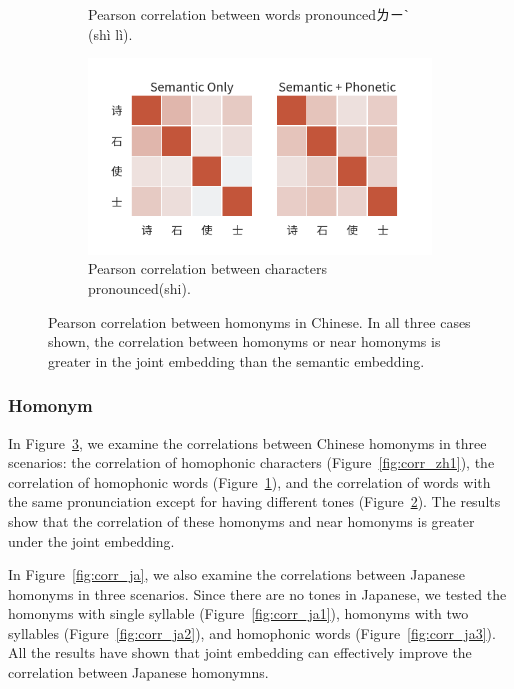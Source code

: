 \begin{figure}[t]
\begin{subfigure}[b]{0.49\textwidth}
        \caption{Pearson correlation between words pronounced ㄌㄧˋ (shì lì).}
        \label{fig:corr_zh2}
    \end{subfigure}
    \begin{subfigure}[b]{0.49\textwidth}
        \centering
        \includegraphics[width=\textwidth]{../images/corr_zh3.png}
        \caption{Pearson correlation between characters pronounced (shi).}
        \label{fig:corr_zh3}
    \end{subfigure}
    \caption{Pearson correlation between homonyms in Chinese.  In all three cases shown, the correlation between homonyms or near homonyms is greater in the joint embedding than the semantic embedding.}
    \label{fig:corr_zh}
\end{figure}

\subsubsection{Homonym}

In Figure~\ref{fig:corr_zh}, we examine the correlations between Chinese homonyms in three scenarios:
the correlation of homophonic characters (Figure~\ref{fig:corr_zh1}), the correlation of homophonic words (Figure~\ref{fig:corr_zh2}), and the correlation of words with the same pronunciation except for having different tones (Figure~\ref{fig:corr_zh3}).
The results show that the correlation of these homonyms and near homonyms is greater under the joint embedding.

In Figure~\ref{fig:corr_ja}, we also examine the correlations between Japanese homonyms in three scenarios. Since there are no tones in Japanese, we tested the homonyms with single syllable (Figure~\ref{fig:corr_ja1}), homonyms with two syllables (Figure~\ref{fig:corr_ja2}), and homophonic words (Figure~\ref{fig:corr_ja3}). All the results have shown that joint embedding can effectively improve the correlation between Japanese homonymns.

